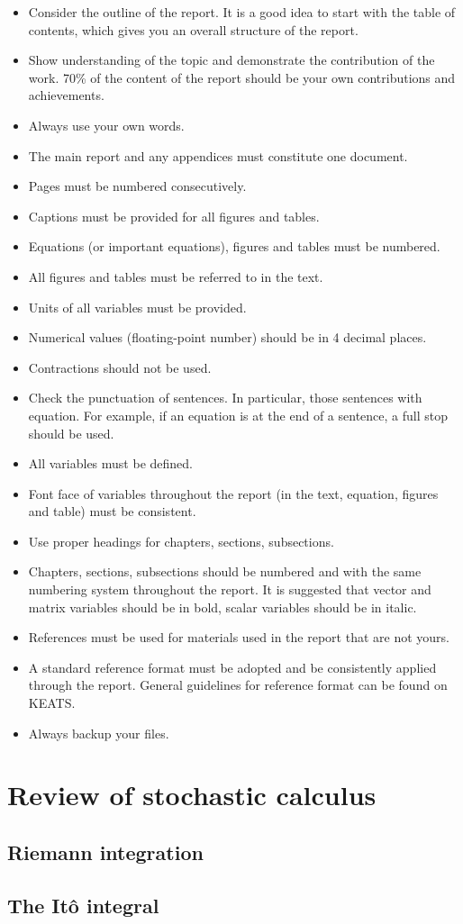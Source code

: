 \begin{itemize}
	\item Consider the outline of the report.  It is a good idea to start with the table of contents, which gives you an overall structure of the report.
	\item Show understanding of the topic and demonstrate the contribution of the work. 70\% of the content of the report should be your own contributions and achievements.
	\item Always use your own words.
	\item The main report and any appendices must constitute one document.
	\item Pages must be numbered consecutively.
	\item Captions must be provided for all figures and tables.
	\item Equations (or important equations), figures and tables must be numbered.
	\item All figures and tables must be referred to in the text.
	\item Units of all variables must be provided.
	\item Numerical values (floating-point number) should be in 4 decimal places.
	\item Contractions should not be used.
	\item Check the punctuation of sentences.  In particular, those sentences with equation.  For example, if an equation is at the end of a sentence, a full stop should be used.
	\item All variables must be defined.
	\item Font face of variables throughout the report (in the text, equation, figures and table) must be consistent.
	\item Use proper headings for chapters, sections, subsections.
	\item Chapters, sections, subsections should be numbered and with the same numbering system throughout the report.
It is suggested that vector and matrix variables should be in bold, scalar variables should be in italic.
	\item References must be used for materials used in the report that are not yours.
	\item A standard reference format must be adopted and be consistently applied through the report.  General guidelines for reference format can be found on KEATS.
	\item Always backup your files.  
\end{itemize}

\section{Review of stochastic calculus}
\subsection{Riemann integration}
\subsection{The It\^o integral}
